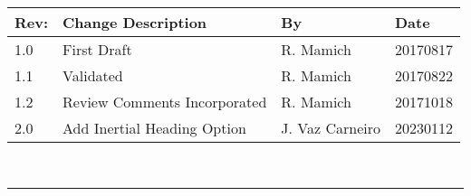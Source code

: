 \documentclass[]{BasiliskReportMemo}
\begin{document}
	
	\makeCover
	
\pagestyle{empty}
{\renewcommand{\arraystretch}{2}
	\noindent
	\begin{longtable}{|p{0.5in}|p{3.5in}|p{1.0in}|p{1.0in}|}
		\hline
		{\bfseries Rev}: & {\bfseries Change Description} & {\bfseries By}  & {\bfseries Date}\\
		\hline
		1.0 & First Draft & R. Mamich & 20170817\\
		\hline
		1.1 & Validated & R. Mamich & 20170822\\
		\hline
        1.2 & Review Comments Incorporated & R. Mamich & 20171018\\
		\hline
		2.0 & Add Inertial Heading Option & J. Vaz Carneiro & 20230112\\
		\hline
		
	\end{longtable}
}
	
	
	
	\newpage
	\setcounter{page}{1}
	\pagestyle{fancy}
	
	\tableofcontents %
	~\\ \hrule ~\\ %
	
	
	
	
	
	
	
	
	
	
	
	
	
		
\end{document}

